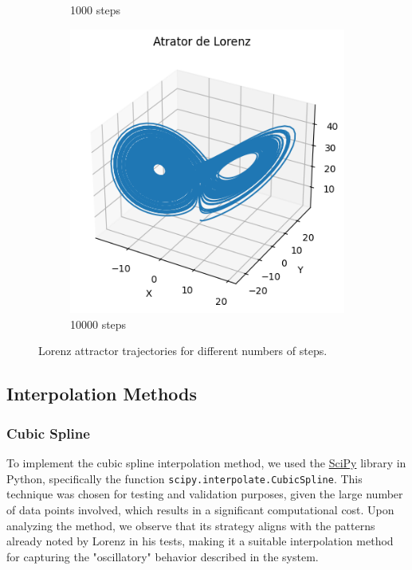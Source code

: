 \documentclass[12pt, a4paper]{article}
\begin{document}
\begin{figure}[H]
\begin{subfigure}{0.32\textwidth}
			\caption{1000 steps}
			\label{fig:lorenz1000}
		\end{subfigure}
		\hfill
		\begin{subfigure}{0.32\textwidth}
			\includegraphics[width=\linewidth]{img/attrator10000.png}
			\caption{10000 steps}
			\label{fig:lorenz10000}
		\end{subfigure}
		\caption{Lorenz attractor trajectories for different numbers of steps.}
		\label{fig:lorenz-comparativo}
	\end{figure}
	
	\subsection{Interpolation Methods}
	
	\subsubsection{Cubic Spline}
	
	To implement the cubic spline interpolation method, we used the
	\href{https://docs.scipy.org/doc/scipy/index.html}{SciPy} library in Python, specifically the function
	\texttt{scipy.interpolate.CubicSpline}. This technique was chosen for testing and validation purposes,
	given the large number of data points involved, which results in a significant computational cost.
	Upon analyzing the method, we observe that its strategy aligns with the patterns already noted by
	Lorenz in his tests, making it a suitable interpolation method for capturing the "oscillatory"
	behavior described in the system.
	
\end{document}
